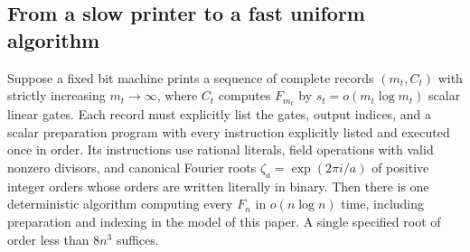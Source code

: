 \subsection{From a slow printer to a fast uniform algorithm}

\begin{theorem}\label{syn:printer}
Suppose a fixed bit machine prints a sequence of complete records
$(m_t,C_t)$ with strictly increasing $m_t\to\infty$, where $C_t$
computes $F_{m_t}$ by $s_t=o(m_t\log m_t)$ scalar linear gates.
Each record must explicitly list the gates, output indices, and a
scalar preparation program with every instruction explicitly listed
and executed once in order.  Its instructions use rational literals, field
operations with valid nonzero divisors, and canonical Fourier roots
$\zeta_a=\exp(2\pi i/a)$ of positive integer orders
whose orders are written literally in binary.  Then there is one
deterministic algorithm computing every $F_n$ in $o(n\log n)$ time,
including preparation and indexing in the model of this paper.
A single specified root of order less than $8n^3$ suffices.
\end{theorem}

